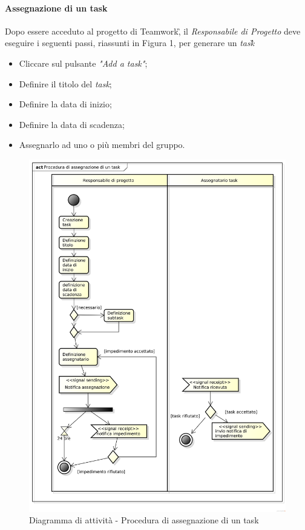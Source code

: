 \paragraph{Assegnazione di un task}
Dopo essere acceduto al progetto di Teamwork\G, il \textit{Responsabile di Progetto} deve eseguire i seguenti passi, riassunti in Figura 1, per generare un \textit{task}\G\:
\begin{itemize}
\item Cliccare sul pulsante \textit{"Add a task"};
\item Definire il titolo del \textit{task};
\item Definire la data di inizio;
\item Definire la data di scadenza;
\item Assegnarlo ad uno o più membri del gruppo.
\end{itemize}

\begin{figure}[htbp]
\centering
\includegraphics[scale=0.5]{png/Procedura di assegnazione di un task.png}
\captionsetup{labelfont=bf}
\caption{Diagramma di attività - Procedura di assegnazione di un task}

\end{figure}

